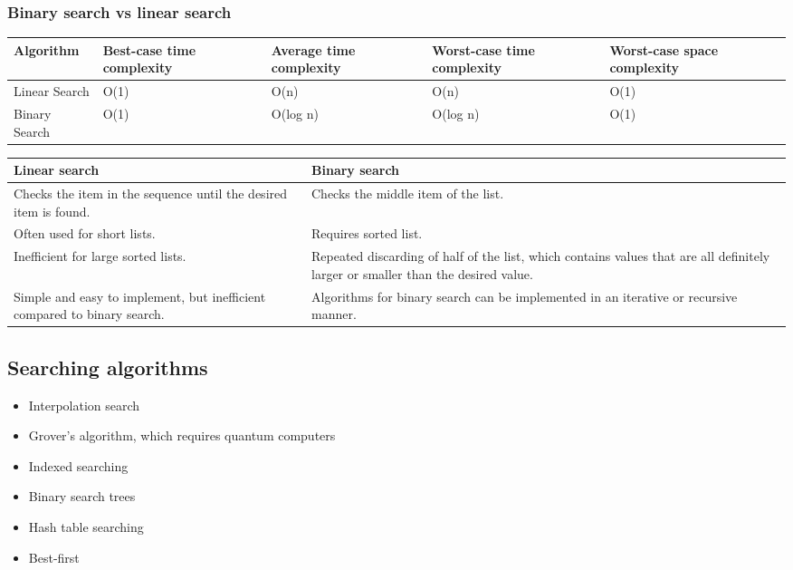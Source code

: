 \documentclass[11pt]{article}
\begin{document}
 \newpage
\subsubsection{Binary search vs linear search}
\label{sec:orgff2bc99}
\begin{center}
\begin{tabular}{|m{6.5em}|m{5em}|m{7em}|m{6em}|m{6em}|}
\hline
\textbf{Algorithm} & \textbf{Best-case time complexity} & \textbf{Average time complexity} & \textbf{Worst-case time complexity} & \textbf{Worst-case space complexity}\\
\hline
Linear Search & O(1) & O(n) & O(n) & O(1)\\
Binary Search & O(1) & O(log n) & O(log n) & O(1)\\
\hline
\end{tabular}
\end{center}

\begin{center}
\begin{tabular}{|m{17em}|m{17em}|}
\hline
\textbf{Linear search} & \textbf{Binary search}\\
\hline
Checks the item in the sequence until the desired item is found. & Checks the middle item of the list.\\
\hline
Often used for short lists. & Requires sorted list.\\
\hline
Inefficient for large sorted lists. & Repeated discarding of half of the list, which contains values that are all definitely larger or smaller than the desired value.\\
\hline
Simple and easy to implement, but inefficient compared to binary search. & Algorithms for binary search can be implemented in an iterative or recursive manner.\\
\hline
\end{tabular}
\end{center}
\subsection{Searching algorithms}
\label{sec:org6c44e7f}
\begin{itemize}
\item Interpolation search
\item Grover's algorithm, which requires quantum computers
\item Indexed searching
\item Binary search trees
\item Hash table searching
\item Best-first
\end{itemize}
\end{document}
